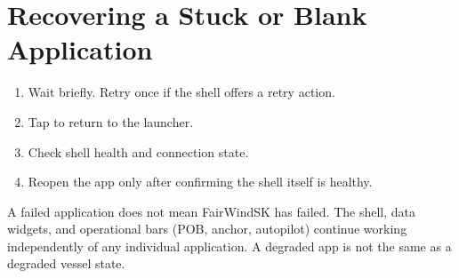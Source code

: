 \section{Recovering a Stuck or Blank Application}

\begin{enumerate}
  \item Wait briefly. Retry once if the shell offers a retry action.
  \item Tap  to return to the launcher.
  \item Check shell health and connection state.
  \item Reopen the app only after confirming the shell itself is healthy.
\end{enumerate}

\begin{tipbox}
A failed application does not mean FairWindSK has failed.
The shell, data widgets, and operational bars (POB, anchor, autopilot) continue
working independently of any individual application.
A degraded app is not the same as a degraded vessel state.
\end{tipbox}
